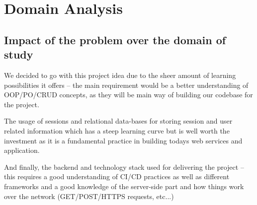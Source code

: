\section{Domain Analysis}

\graphicspath{ {./Images/} }

\subsection{Impact of the problem over the domain of study}
\par We decided to go with this project idea due to the sheer amount of learning possibilities it offers – the main requirement would be a better understanding of OOP/PO/CRUD concepts, as they will be main way of building our codebase for the project.  

The usage of sessions and relational data-bases for storing session and user related information which has a steep learning curve but is well worth the investment as it is a fundamental practice in building todays web services and application. 

And finally, the backend and technology stack used for delivering the project – this requires a good understanding of CI/CD practices as well as different frameworks and a good knowledge of the server-side part and how things work over the network (GET/POST/HTTPS requests, etc...) 

